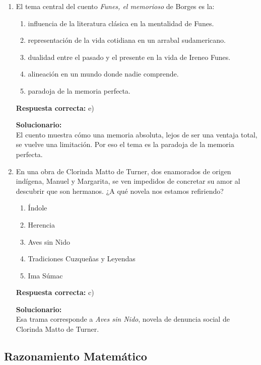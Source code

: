 \begin{enumerate}
	
	\item El tema central del cuento \textit{Funes, el memorioso} de Borges es la:
	\begin{enumerate}[label=\alph*)]
		\item influencia de la literatura clásica en la mentalidad de Funes.
		\item representación de la vida cotidiana en un arrabal sudamericano.
		\item dualidad entre el pasado y el presente en la vida de Ireneo Funes.
		\item alineación en un mundo donde nadie comprende.
		\item paradoja de la memoria perfecta.
	\end{enumerate}
	\textbf{Respuesta correcta:} e)
	
	\vspace{2mm}
	\textbf{Solucionario:}\\
	El cuento muestra cómo una memoria absoluta, lejos de ser una ventaja total, se vuelve una limitación. Por eso el tema es la paradoja de la memoria perfecta.
	
	\vspace{6mm}
	
	\item En una obra de Clorinda Matto de Turner, dos enamorados de origen indígena, Manuel y Margarita, se ven impedidos de concretar su amor al descubrir que son hermanos. ¿A qué novela nos estamos refiriendo?
	\begin{enumerate}[label=\alph*)]
		\item Índole
		\item Herencia
		\item Aves sin Nido
		\item Tradiciones Cuzqueñas y Leyendas
		\item Ima Súmac
	\end{enumerate}
	\textbf{Respuesta correcta:} c)
	
	\vspace{2mm}
	\textbf{Solucionario:}\\
	Esa trama corresponde a \textit{Aves sin Nido}, novela de denuncia social de Clorinda Matto de Turner.
	
	\vspace{6mm}
	
\end{enumerate}

\subsection*{Razonamiento Matemático}

